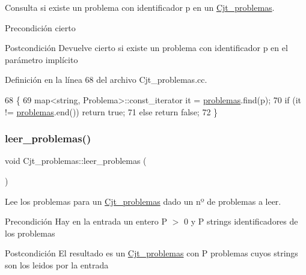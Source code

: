 Consulta si existe un problema con identificador p en un \mbox{\hyperlink{class_cjt__problemas}{Cjt\+\_\+problemas}}. 

\begin{DoxyPrecond}{Precondición}
cierto 
\end{DoxyPrecond}
\begin{DoxyPostcond}{Postcondición}
Devuelve cierto si existe un problema con identificador p en el parámetro implícito 
\end{DoxyPostcond}


Definición en la línea 68 del archivo Cjt\+\_\+problemas.\+cc.


\begin{DoxyCode}
68                                                              \{
69       map<string, Problema>::const\_iterator it = \mbox{\hyperlink{class_cjt__problemas_aad49222fb63517d7d7fc3d691f045cc5}{problemas}}.find(p);
70       \textcolor{keywordflow}{if} (it != \mbox{\hyperlink{class_cjt__problemas_aad49222fb63517d7d7fc3d691f045cc5}{problemas}}.end()) \textcolor{keywordflow}{return} \textcolor{keyword}{true};
71       \textcolor{keywordflow}{else} \textcolor{keywordflow}{return} \textcolor{keyword}{false};
72     \}
\end{DoxyCode}
\mbox{\label{class_cjt__problemas_a38d418d08be011f8cfbdfdac1ad2451a}} 
\subsubsection{\texorpdfstring{leer\+\_\+problemas()}{leer\_problemas()}}
{\footnotesize\ttfamily void Cjt\+\_\+problemas\+::leer\+\_\+problemas (\begin{DoxyParamCaption}{ }\end{DoxyParamCaption})}



Lee los problemas para un \mbox{\hyperlink{class_cjt__problemas}{Cjt\+\_\+problemas}} dado un nº de problemas a leer. 

\begin{DoxyPrecond}{Precondición}
Hay en la entrada un entero P $>$ 0 y P strings identificadores de los problemas 
\end{DoxyPrecond}
\begin{DoxyPostcond}{Postcondición}
El resultado es un \mbox{\hyperlink{class_cjt__problemas}{Cjt\+\_\+problemas}} con P problemas cuyos strings son los leidos por la entrada 
\end{DoxyPostcond}


